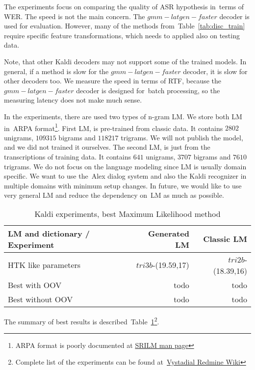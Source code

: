 The experiments focus on comparing the quality of ASR hypothesis in~terms of \ac{WER}.
The speed is not the main concern.  The $gmm-latgen-faster$ decoder is used for evaluation. 
However, many of the methods from~Table~\ref{tab:disc_train}
require specific feature transformations, which needs to applied also on testing data.

Note, that other Kaldi decoders may not support some of the trained models.
In general, if a method is slow for the $gmm-latgen-faster$ decoder, it is slow for other decoders too.
We measure the speed in terms of \ac{RTF}, because the $gmm-latgen-faster$ decoder is designed for~batch 
processing, so the measuring latency does not make much sense.

In the experiments, there are used two types of n-gram \acl{LM}. 
We store both \ac{LM} in~ARPA format\footnote{ARPA format is poorly documented at 
\href{http://www.speech.sri.com/projects/srilm/manpages/ngram-format.5.html}{SRILM man page}}.
First \ac{LM}, is pre-trained from classic data. It contains $2802$ unigrams, $109315$ bigrams and
$118217$ trigrams. We will not publish the model, and we did not trained it ourselves. 
The second \ac{LM}, is just from the transcriptions of training data. It contains 
$641$ unigrams, $3707$ bigrams and $7610$ trigrams.
We do not focus on the language modeling since \ac{LM} is usually domain specific.
We want to use the~Alex dialog system and also the Kaldi recognizer in multiple domains with minimum
setup changes. In future, we would like to use very general \ac{LM} and reduce the dependency on~\ac{LM}
as much as possible.

\begin{table}[!htp]\label{tab:exp_best}
\begin{tabular}{lrr}
\hline
\parbox[t]{6.0cm}{\ac{LM} and dictionary / Experiment} & Generated \acs{LM}  & Classic \ac{LM} \\
\hline
\ac{HTK} like parameters    &  $tri3b$-(19.59,17) & $tri2b$-(18.39,16) \\
Best with OOV               & todo & todo \\
Best without OOV            & todo & todo \\
\hline
\end{tabular}
\caption{Kaldi experiments, best Maximum Likelihood method}
\end{table}

The summary of best results is described~Table~\ref{tab:exp_best}\footnote{ 
Complete list of the experiments can be found 
at~\href{https://redmine.ms.mff.cuni.cz/projects/Vystadial/wiki/Acoustic_models/}{Vystadial Redmine Wiki}}. 

